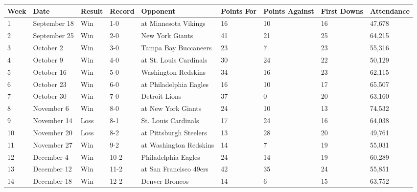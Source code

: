 \documentclass{article}
\begin{document}
\begin{tabular}{lllllllll}
\toprule
Week & Date & Result & Record & Opponent & Points For & Points Against & First Downs & Attendance \\
\midrule
1 & September 18 & Win & 1-0 & at Minnesota Vikings & 16 & 10 & 16 & 47,678 \\
2 & September 25 & Win & 2-0 & New York Giants & 41 & 21 & 25 & 64,215 \\
3 & October 2 & Win & 3-0 & Tampa Bay Buccaneers & 23 & 7 & 23 & 55,316 \\
4 & October 9 & Win & 4-0 & at St. Louis Cardinals & 30 & 24 & 22 & 50,129 \\
5 & October 16 & Win & 5-0 & Washington Redskins & 34 & 16 & 23 & 62,115 \\
6 & October 23 & Win & 6-0 & at Philadelphia Eagles & 16 & 10 & 17 & 65,507 \\
7 & October 30 & Win & 7-0 & Detroit Lions & 37 & 0 & 20 & 63,160 \\
8 & November 6 & Win & 8-0 & at New York Giants & 24 & 10 & 13 & 74,532 \\
9 & November 14 & Loss & 8-1 & St. Louis Cardinals & 17 & 24 & 16 & 64,038 \\
10 & November 20 & Loss & 8-2 & at Pittsburgh Steelers & 13 & 28 & 20 & 49,761 \\
11 & November 27 & Win & 9-2 & at Washington Redskins & 14 & 7 & 19 & 55,031 \\
12 & December 4 & Win & 10-2 & Philadelphia Eagles & 24 & 14 & 19 & 60,289 \\
13 & December 12 & Win & 11-2 & at San Francisco 49ers & 42 & 35 & 24 & 55,851 \\
14 & December 18 & Win & 12-2 & Denver Broncos & 14 & 6 & 15 & 63,752 \\
\bottomrule
\end{tabular}
\end{document}
